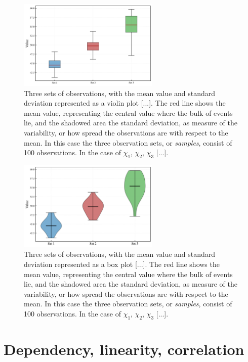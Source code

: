 \documentclass{book}
\begin{document}
\begin{figure}[ht]
    \centering
    \includegraphics[width=0.6\textwidth]{figures/chapter1/measurements_boxplot.png}
    \caption{Three sets of observations, with the mean value and standard deviation represented as a violin plot [...]. The red line shows the mean value, representing the central value where the bulk of events lie, and the shadowed area the standard deviation, as measure of the variability, or how spread the observations are with respect to the mean. In this case the three observation sets, or \textit{samples}, consist of 100 observations. In the case of $\chi_1$, $\chi_2$, $\chi_3$ [...].}
    \label{fig:histogram1}
\end{figure}

\begin{figure}[ht]
    \centering
    \includegraphics[width=0.6\textwidth]{figures/chapter1/measurements_violin.png}
    \caption{Three sets of observations, with the mean value and standard deviation represented as a box plot [...]. The red line shows the mean value, representing the central value where the bulk of events lie, and the shadowed area the standard deviation, as measure of the variability, or how spread the observations are with respect to the mean. In this case the three observation sets, or \textit{samples}, consist of 100 observations. In the case of $\chi_1$, $\chi_2$, $\chi_3$ [...].}
    \label{fig:histogram1}
\end{figure}

\section{Dependency, linearity, correlation}
\end{document}
